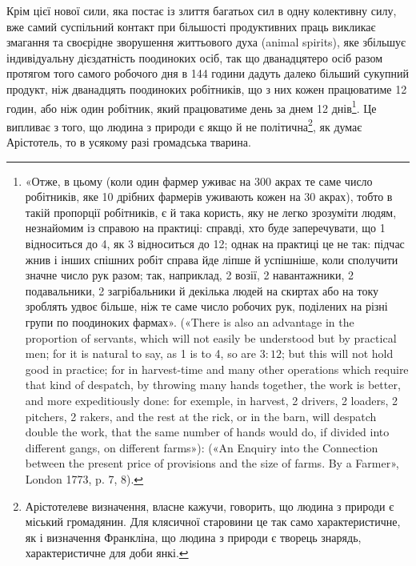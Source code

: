 Крім цієї нової сили, яка постає із злиття багатьох сил в одну
колективну силу, вже самий суспільний контакт при більшості
продуктивних праць викликає змагання та своєрідне зворушення
життьового духа (animal spirits), яке збільшує індивідуальну
дієздатність поодиноких осіб, так що дванадцятеро осіб
разом протягом того самого робочого дня в 144 години дадуть
далеко більший сукупний продукт, ніж дванадцять поодиноких
робітників, що з них кожен працюватиме 12 годин, або ніж один
робітник, який працюватиме день за днем 12 днів\footnote{
«Отже, в цьому (коли один фармер уживає на 300 акрах те саме
число робітників, яке 10 дрібних фармерів уживають кожен на 30 акрах),
тобто в такій пропорції робітників, є й така користь, яку не легко зрозуміти
людям, незнайомим із справою на практиці: справді, хто буде
заперечувати, що 1 відноситься до 4, як 3 відноситься до 12; однак на
практиці це не так: підчас жнив і інших спішних робіт справа йде ліпше
й успішніше, коли сполучити значне число рук разом; так, наприклад,
2 возії, 2 навантажники, 2 подавальники, 2 загрібальники й декілька
людей на скиртах або на току зроблять удвоє більше, ніж те саме число
робочих рук, поділених на різні групи по поодиноких фармах». («There
is also an advantage in the proportion of servants, which will not easily be
understood but by practical men; for it is natural to say, as 1 is to 4, so
are $3: 12$; but this will not hold good in practice; for in harvest-time
and many other operations which require that kind of despatch, by throwing
many hands together, the work is better, and more expeditiously done:
for exemple, in harvest, 2 drivers, 2 loaders, 2 pitchers, 2 rakers, and the
rest at the rick, or in the barn, will despatch double the work, that the same
number of hands would do, if divided into different gangs, on different
farms»): («An Enquiry into the Connection between the present price of
provisions and the size of farms. By a Farmer», London 1773, p. 7, 8).
}. Це випливає
з того, що людина з природи є якщо й не політична\footnote{
Арістотелеве визначення, власне кажучи, говорить, що людина з природи є міський громадянин.
Для клясичної старовини це так само
характеристичне, як і визначення Франкліна, що людина з природи є
творець знарядь, характеристичне для доби янкі.
}, як думає
Арістотель, то в усякому разі громадська тварина.

